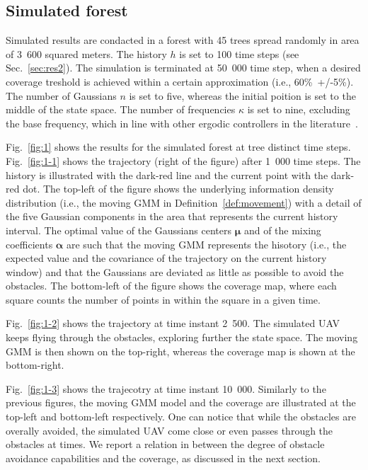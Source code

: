 \documentclass[letterpaper,10pt,conference,twoside]{IEEEtran}
\theoremstyle{definition}
\begin{document}
\subsection{Simulated forest}\label{sec:res1}
\noindent
Simulated results are condacted in a forest with 45 trees spread randomly in area of 3~600 squared meters. The history $h$ is set to 100 time steps (see Sec.~\ref{sec:res2}). The simulation is terminated at 50~000 time step, when a desired coverage treshold is achieved within a certain approximation (i.e., 60\%~+/-5\%). The number of Gaussians $n$ is set to five, whereas the initial poition is set to the middle of the state space. The number of frequencies $\kappa$ is set to nine, excluding the base frequency, which in line with other ergodic controllers in the literature~\cite{seewald2022energy}. 

Fig.~\ref{fig:1} shows the results for the simulated forest at tree distinct time steps. Fig.~\ref{fig:1-1} shows the trajectory (right of the figure) after 1~000 time steps. The history is illustrated with the dark-red line and the current point with the dark-red dot. The top-left of the figure shows the underlying information density distribution (i.e., the moving GMM in Definition~\ref{def:movement}) with a detail of the five Gaussian components in the area that represents the current history interval. The optimal value of the Gaussians centers $\boldsymbol{\mu}$ and of the mixing coefficients $\boldsymbol{\alpha}$ are such that the moving GMM represents the hisotory (i.e., the expected value and the covariance of the trajectory on the current history window) and that the Gaussians are deviated as little as possible to avoid the obstacles.
The bottom-left of the figure shows the coverage map, where each square counts the number of points in within the square in a given time.

Fig.~\ref{fig:1-2} shows the trajectory at time instant 2~500. The simulated UAV keeps flying through the obstacles, exploring further the state space. The moving GMM is then shown on the top-right, whereas the coverage map is shown at the bottom-right.

Fig.~\ref{fig:1-3} shows the trajecotry at time instant 10~000. Similarly to the previous figures, the moving GMM model and the coverage are illustrated at the top-left and bottom-left respectively. One can notice that while the obstacles are overally avoided, the simulated UAV come close or even passes through the obstacles at times. We report a relation in between the degree of obstacle avoidance capabilities and the coverage, as discussed in the next section.
\end{document}
